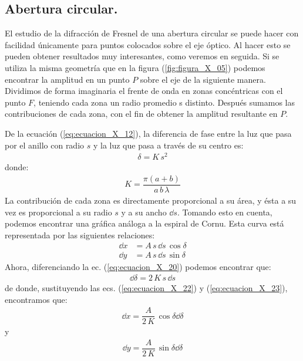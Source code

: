 \documentclass[14pt]{extarticle}
\begin{document}
\subsection{Abertura circular.}

El estudio de la difracción de Fresnel de una abertura circular se puede hacer con facilidad únicamente para puntos colocados sobre el eje óptico. Al hacer esto se pueden obtener resultados muy interesantes, como veremos en seguida. Si se utiliza la misma geometría que en la figura (\ref{fig:figura_X_05}) podemos encontrar la amplitud en un punto $P$ sobre el eje de la siguiente manera. Dividimos de forma imaginaria el frente de onda en zonas concéntricas con el punto $F$, teniendo cada zona un radio promedio s distinto. Después sumamos las contribuciones de cada zona, con el fin de obtener la amplitud resultante en $P$.
\par
De la ecuación (\ref{eq:ecuacion_X_12}), la diferencia de fase entre la luz que pasa por el anillo con radio $s$ y la luz que pasa a través de su centro es:
\begin{align}
\delta = K \, s^{2}
\label{eq:ecuacion_X_20}
\end{align}
donde:
\begin{align}
K = \dfrac{\pi (a + b)}{a \, b \, \lambda}
\label{eq:ecuacion_X_21}
\end{align}
La contribución de cada zona es directamente proporcional a su área, y ésta a su vez es proporcional a su radio $s$ y a su ancho $\dd{s}$. Tomando esto en cuenta, podemos encontrar una gráfica análoga a la espiral de Cornu. Esta curva está representada por las siguientes relaciones:
\begin{eqnarray}
\dd{x} &= A \, s \, \dd{s} \, \cos \delta \label{eq:ecuacion_X_22} \\[0.5em]
\dd{y} &= A \, s \, \dd{s} \, \sin \delta \label{eq:ecuacion_X_23}
\end{eqnarray}
Ahora, diferenciando la ec. (\ref{eq:ecuacion_X_20}) podemos encontrar que:
\begin{align}
\dd{\delta} = 2 \, K \, s \, \dd{s}
\label{eq:ecuacion_X_24}
\end{align}
de donde, sustituyendo las ecs. (\ref{eq:ecuacion_X_22}) y (\ref{eq:ecuacion_X_23}), encontramos que:
\begin{align}
\dd{x} = \dfrac{A}{2 \, K} \, \cos \delta \dd{\delta}
\label{eq:ecuacion_X_25}
\end{align}
y
\begin{align}
\dd{y} = \dfrac{A}{2 \, K} \, \sin \delta \dd{\delta}
\label{eq:ecuacion_X_26}
\end{align}
\end{document}
